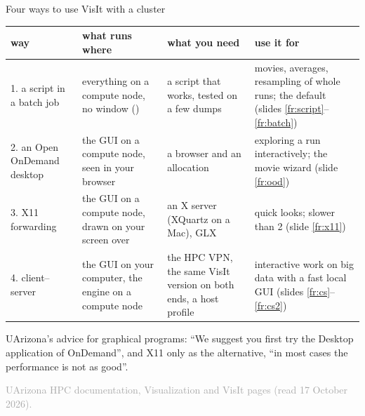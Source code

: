 \documentclass[aspectratio=169,11pt]{beamer}
\newcommand{\sourcecredit}[1]{\vfill\begin{flushright}\tiny\textcolor{DarkGray}{#1}\end{flushright}}
\begin{document}
\begin{frame}{Four ways to use VisIt with a cluster}
\label{fr:ways}
\scriptsize
\begin{tabular}{@{}L{0.15\textwidth}L{0.26\textwidth}L{0.23\textwidth}L{0.25\textwidth}@{}}
\toprule
way & what runs where & what you need & use it for \\
. a script in a batch job & everything on a compute node, no window () & a script that works, tested on a few dumps & movies, averages, resampling of whole runs; the default (slides \ref{fr:script}--\ref{fr:batch}) \\
2. an Open OnDemand desktop & the GUI on a compute node, seen in your browser & a browser and an allocation & exploring a run interactively; the movie wizard (slide \ref{fr:ood}) \\
3. X11 forwarding & the GUI on a compute node, drawn on your screen over  & an X server (XQuartz on a Mac), GLX & quick looks; slower than 2 (slide \ref{fr:x11}) \\
4. client--server & the GUI on your computer, the engine on a compute node & the HPC VPN, the same VisIt version on both ends, a host profile & interactive work on big data with a fast local GUI (slides \ref{fr:cs}--\ref{fr:cs2}) \\
\bottomrule
\end{tabular}

\vspace{2mm}
\footnotesize UArizona's advice for graphical programs: ``We suggest you first try the Desktop application of OnDemand'', and X11 only as the alternative, ``in most cases the performance is not as good''.
\sourcecredit{UArizona HPC documentation, Visualization and VisIt pages (read 17 October 2026).}
\end{frame}
\end{document}
